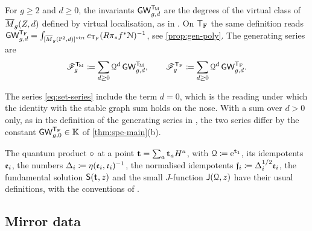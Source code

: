 For $g\geq 2$ and $d\geq 0$, the invariants $\mathsf{GW}_{g,d}^{\mathsf{T}_{\!\mathrm{M}}}$ are the degrees of the virtual class of $\overline{M}_g(Z,d)$ defined by virtual localisation, as in \cite{BS}. On $\mathsf{T}_{\mathrm{F}}$ the same definition reads $\mathsf{GW}_{g,d}^{\mathsf{T}_{\mathrm{F}}}=\int_{[\overline{M}_g(\mathbb{P}^2,d)]^{\mathrm{virt}}}e_{\mathsf{T}_{\mathrm{F}}}(R\pi_*f^*\mathcal{N})^{-1}$, see \cref{prop:gen-poly}. The generating series are
\begin{equation}
\label{eq:set-series}
\mathscr{F}_g^{\mathsf{T}_{\!\mathrm{M}}}\coloneqq\sum_{d\geq 0}\mathcal{Q}^d\,\mathsf{GW}_{g,d}^{\mathsf{T}_{\!\mathrm{M}}},\qquad
\mathscr{F}_g^{\mathsf{T}_{\mathrm{F}}}\coloneqq\sum_{d\geq 0}\mathcal{Q}^d\,\mathsf{GW}_{g,d}^{\mathsf{T}_{\mathrm{F}}}.
\end{equation}

\begin{rmk}[The term $d=0$; {\Lg{Remark~2.1}}]
\label{rmk:set-d0}
The series \eqref{eq:set-series} include the term $d=0$, which is the reading under which the identity with the stable graph sum holds on the nose. With a sum over $d>0$ only, as in the definition of the generating series in \cite{BS}, the two series differ by the constant $\mathsf{GW}_{g,0}^{\mathsf{T}_{\mathrm{F}}}\in\mathbb{K}$ of \cref{thm:spe-main}\textup{(b)}.
\end{rmk}

The quantum product $\circ$ at a point $\mathbf{t}=\sum_a\mathbf{t}_aH^a$, with $\mathcal{Q}\coloneqq\mathrm{e}^{\mathbf{t}_1}$, its idempotents $\mathfrak{e}_i$, the numbers $\Delta_i\coloneqq\eta(\mathfrak{e}_i,\mathfrak{e}_i)^{-1}$, the normalised idempotents $\mathfrak{f}_i\coloneqq\Delta_i^{1/2}\mathfrak{e}_i$, the fundamental solution $\mathsf{S}(\mathbf{t},z)$ and the small $J$-function $\mathsf{J}(\mathcal{Q},z)$ have their usual definitions, with the conventions of .

\subsection{Mirror data}
\label{sec:set-mirror}

